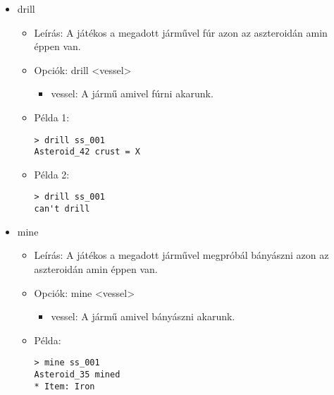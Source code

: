 \documentclass[../../projlab]{subfiles}
\begin{document}
\begin{itemize}
    \item drill
    \begin{itemize}
        \item Leírás: A játékos a megadott járművel fúr azon az aszteroidán amin éppen van.
        \item Opciók: drill <vessel>
        \begin{itemize}
            \item vessel: A jármű amivel fúrni akarunk.
        \end{itemize}
        \item Példa 1:
            \begin{verbatim}
> drill ss_001 
Asteroid_42 crust = X
            \end{verbatim}
        \item Példa 2:
            \begin{verbatim}
> drill ss_001 
can't drill
            \end{verbatim}
    \end{itemize}


    \item mine
    \begin{itemize}
        \item Leírás: A játékos a megadott járművel megpróbál bányászni azon az aszteroidán amin éppen van.
        \item Opciók: mine <vessel>
        \begin{itemize}
            \item vessel: A jármű amivel bányászni akarunk.
        \end{itemize}
        \item Példa:
            \begin{verbatim}
> mine ss_001
Asteroid_35 mined
* Item: Iron
            \end{verbatim}
    \end{itemize}



\end{itemize}
\end{document}
